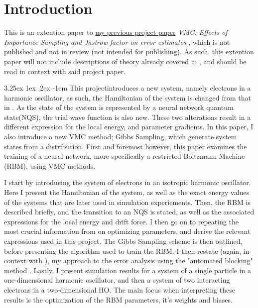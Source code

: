 \documentclass[%
oneside,                 %
final,                   %
10pt]{article}
\makeatletter
\renewcommand\paragraph{\@startsection{paragraph}{5}{\z@}%
  {3.25ex \@plus1ex \@minus.2ex}%
  {-1em}%
  {\normalfont\normalsize\bfseries}}
\makeatother
\begin{document}
\section{Introduction}
This is an extention paper to \href{https://github.com/johanere/FYS4411/tree/master/Project\%201}{my previous project paper} \textit{VMC: Effects of Importance Sampling and Jastrow factor on error estimates} \cite{JN_P1}, which is not published and not in review (not intended for publishing). As such, this extention paper will not include descriptions of theory already covered in \cite{JN_P1}, and should be read in context with said project paper.

\paragraph{This project}introduces a new system, namely electrons in a harmonic oscillator, as such, the Hamiltonian of the system is changed from that in \cite{JN_P1}. As the state of the system is represented by a neural network quantum state(NQS), the trial wave function is also new. These two alterations result in a different expression for the local energy, and parameter gradients. In this paper, I also introduce a new VMC method; Gibbs Sampling, which generate system states from a distribution. First and foremost however, this paper examines the training of a neural network, more specifically a restricted Boltzmann Machine (RBM), using VMC methods. 

I start by introducing the system of electrons in an isotropic harmonic oscillator. Here I present the Hamiltonian of the system, as well as the exact energy values of the systems that are later used in simulation experiements. Then, the RBM is described briefly, and the transition to an NQS is stated, as well as the associated expressions for the local energy and drift force. I then go on to repeating the most crucial information from \cite{JN_P1} on optimizing parameters, and derive the relevant expressions used in this project. The Gibbs Sampling scheme is then outlined, before presenting the algorithm used to train the RBM. I then restate (again, in context with \cite{JN_P1}), my approach to the error analysis using the "automated blocking" method \cite{Jonsson}. Lastly, I present simulation results for a system of a single particle in a one-dimensional harmonic oscillator, and then a system of two interacting electrons in a two-dimensional HO. The main focus when interpreting these results is the optimization of the RBM parameters, it's weights and biases. 
\end{document}
